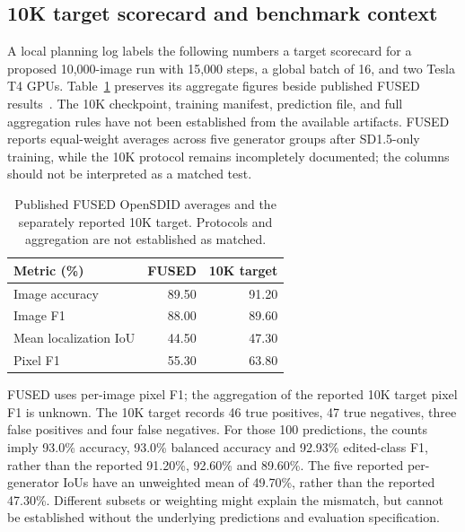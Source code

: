 \subsection{10K target scorecard and benchmark context}
A local planning log labels the following numbers a target scorecard for a proposed 10,000-image run with 15,000 steps, a global batch of 16, and two Tesla T4 GPUs. Table~\ref{tab:reported10k} preserves its aggregate figures beside published FUSED results~\cite{fused}. The 10K checkpoint, training manifest, prediction file, and full aggregation rules have not been established from the available artifacts. FUSED reports equal-weight averages across five generator groups after SD1.5-only training, while the 10K protocol remains incompletely documented; the columns should not be interpreted as a matched test.
\begin{table}[t]
\centering\small
\caption{Published FUSED OpenSDID averages and the separately reported 10K target. Protocols and aggregation are not established as matched.}
\label{tab:reported10k}
\begin{tabular}{@{}lrr@{}}\toprule
Metric (\%) & FUSED & 10K target \\\midrule
Image accuracy & 89.50 & 91.20 \\
Image F1 & 88.00 & 89.60 \\
Mean localization IoU & 44.50 & 47.30 \\
Pixel F1 & 55.30 & 63.80 \\\bottomrule
\end{tabular}
\end{table}
FUSED uses per-image pixel F1; the aggregation of the reported 10K target pixel F1 is unknown. The 10K target records 46 true positives, 47 true negatives, three false positives and four false negatives. For those 100 predictions, the counts imply 93.0\% accuracy, 93.0\% balanced accuracy and 92.93\% edited-class F1, rather than the reported 91.20\%, 92.60\% and 89.60\%. The five reported per-generator IoUs have an unweighted mean of 49.70\%, rather than the reported 47.30\%. Different subsets or weighting might explain the mismatch, but cannot be established without the underlying predictions and evaluation specification.

